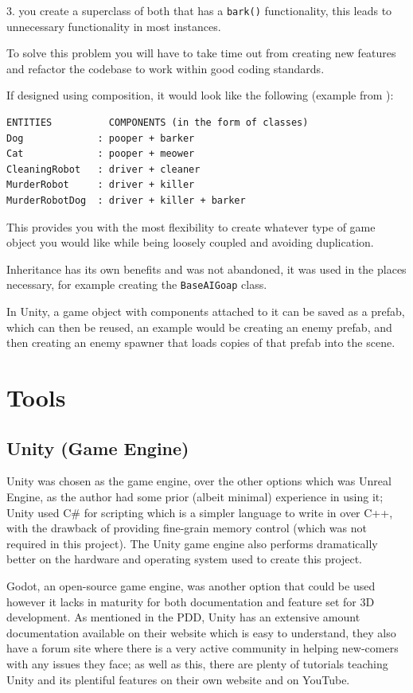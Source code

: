 \documentclass[11pt]{report}
\begin{document}
3. you create a superclass of both that has a  \lstinline{bark()} functionality, this leads to unnecessary functionality in most instances. 

To solve this problem you will have to take time out from creating new features and refactor the codebase to work within good coding standards\cite{codingPractices}.

If designed using composition, it would look like the following (example from \cite{CompOverInherit}):
\begin{lstlisting}[frame=single]
ENTITIES          COMPONENTS (in the form of classes)
Dog             : pooper + barker
Cat             : pooper + meower
CleaningRobot   : driver + cleaner
MurderRobot     : driver + killer
MurderRobotDog  : driver + killer + barker
\end{lstlisting}
This provides you with the most flexibility to create whatever type of game object you would like while being loosely coupled and avoiding duplication.

Inheritance has its own benefits and was not abandoned, it was used in the places necessary, for example creating the \lstinline{BaseAIGoap} class.

In Unity, a game object with components attached to it can be saved as a prefab, which can then be reused, an example would be creating an enemy prefab, and then creating an enemy spawner that loads copies of that prefab into the scene.

\section{Tools}

\subsection{Unity (Game Engine)}
Unity\cite{unity} was chosen as the game engine, over the other options which was Unreal Engine\cite{unrealEngine}, as the author had some prior (albeit minimal) experience in using it; Unity used C\# for scripting which is a simpler language to write in over C++, with the drawback of providing fine-grain memory control (which was not required in this project). The Unity game engine also performs dramatically better on the hardware and operating system used to create this project.

Godot, an open-source game engine, was another option that could be used however it lacks in maturity for both documentation and feature set for 3D development\cite{godot}. As mentioned in the PDD, Unity has an extensive amount documentation available on their website which is easy to understand, they also have a forum site where there is a very active community in helping new-comers with any issues they face; as well as this, there are plenty of tutorials teaching Unity and its plentiful features on their own website and on YouTube.
\end{document}
